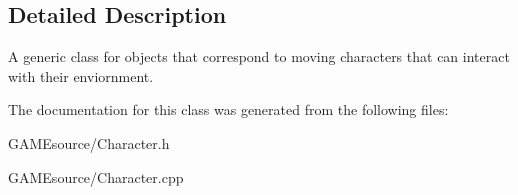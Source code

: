 \subsection{Detailed Description}
A generic class for objects that correspond to moving characters that can interact with their enviornment. 

The documentation for this class was generated from the following files\+:\begin{DoxyCompactItemize}
\item 
G\+A\+M\+Esource/Character.\+h\item 
G\+A\+M\+Esource/Character.\+cpp\end{DoxyCompactItemize}
